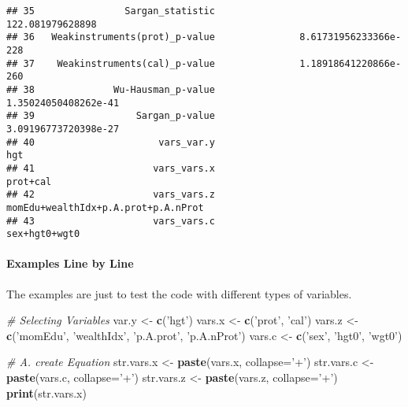 \documentclass[
]{book}
\newenvironment{Shaded}{\begin{snugshade}}{\end{snugshade}}
\newcommand{\CommentTok}[1]{\textcolor[rgb]{0.56,0.35,0.01}{\textit{#1}}}
\newcommand{\DataTypeTok}[1]{\textcolor[rgb]{0.13,0.29,0.53}{#1}}
\newcommand{\KeywordTok}[1]{\textcolor[rgb]{0.13,0.29,0.53}{\textbf{#1}}}
\newcommand{\NormalTok}[1]{#1}
\newcommand{\StringTok}[1]{\textcolor[rgb]{0.31,0.60,0.02}{#1}}
\begin{document}
\begin{verbatim}
## 35                Sargan_statistic                    122.081979628898
## 36   Weakinstruments(prot)_p-value               8.61731956233366e-228
## 37    Weakinstruments(cal)_p-value               1.18918641220866e-260
## 38              Wu-Hausman_p-value                1.35024050408262e-41
## 39                  Sargan_p-value                3.09196773720398e-27
## 40                      vars_var.y                                 hgt
## 41                     vars_vars.x                            prot+cal
## 42                     vars_vars.z momEdu+wealthIdx+p.A.prot+p.A.nProt
## 43                     vars_vars.c                       sex+hgt0+wgt0
\end{verbatim}

\hypertarget{examples-line-by-line}{%
\paragraph{Examples Line by Line}\label{examples-line-by-line}}

The examples are just to test the code with different types of variables.

\begin{Shaded}
\begin{Highlighting}[]
\CommentTok{# Selecting Variables}
\NormalTok{var.y <-}\StringTok{ }\KeywordTok{c}\NormalTok{(}\StringTok{'hgt'}\NormalTok{)}
\NormalTok{vars.x <-}\StringTok{ }\KeywordTok{c}\NormalTok{(}\StringTok{'prot'}\NormalTok{, }\StringTok{'cal'}\NormalTok{)}
\NormalTok{vars.z <-}\StringTok{ }\KeywordTok{c}\NormalTok{(}\StringTok{'momEdu'}\NormalTok{, }\StringTok{'wealthIdx'}\NormalTok{, }\StringTok{'p.A.prot'}\NormalTok{, }\StringTok{'p.A.nProt'}\NormalTok{)}
\NormalTok{vars.c <-}\StringTok{ }\KeywordTok{c}\NormalTok{(}\StringTok{'sex'}\NormalTok{, }\StringTok{'hgt0'}\NormalTok{, }\StringTok{'wgt0'}\NormalTok{)}
\end{Highlighting}
\end{Shaded}

\begin{Shaded}
\begin{Highlighting}[]
\CommentTok{# A. create Equation}
\NormalTok{str.vars.x <-}\StringTok{ }\KeywordTok{paste}\NormalTok{(vars.x, }\DataTypeTok{collapse=}\StringTok{'+'}\NormalTok{)}
\NormalTok{str.vars.c <-}\StringTok{ }\KeywordTok{paste}\NormalTok{(vars.c, }\DataTypeTok{collapse=}\StringTok{'+'}\NormalTok{)}
\NormalTok{str.vars.z <-}\StringTok{ }\KeywordTok{paste}\NormalTok{(vars.z, }\DataTypeTok{collapse=}\StringTok{'+'}\NormalTok{)}
\KeywordTok{print}\NormalTok{(str.vars.x)}
\end{Highlighting}
\end{Shaded}
\end{document}
